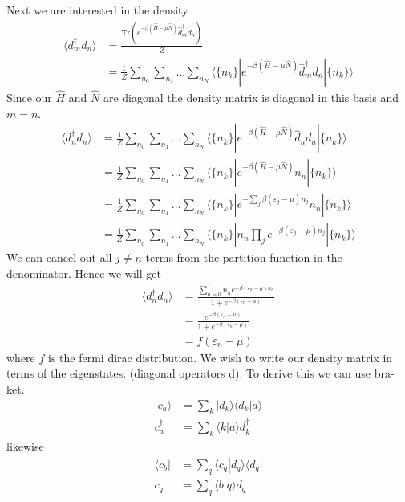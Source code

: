\documentclass[11pt]{article}
\begin{document}
Next we are interested in the density
\begin{align}
    \langle d^\dagger_m d_n \rangle &= \frac{\text{Tr}\left(e^{-\beta(\hat H - \mu \hat N)}\hat d_m^\dagger d_n\right)}{Z} \\\nonumber
    &= \frac{1}{Z} \sum_{n_0}\sum_{n_1}\ldots\sum_{n_N} \langle \{n_k\}|e^{-\beta(\hat H - \mu \hat N)}\hat d_m^\dagger d_n|\{n_k\}\rangle
\end{align}
Since our $\hat H$ and $\hat N$ are diagonal the density matrix is diagonal in this basis and $m = n$.
\begin{align}
    \langle d^\dagger_n d_n \rangle &=\frac{1}{Z}\sum_{n_0}\sum_{n_1}\ldots\sum_{n_N} \langle \{n_k\}|e^{-\beta(\hat H - \mu \hat N)}\hat d_n^\dagger d_n|\{n_k\}\rangle \\\nonumber
    &=\frac{1}{Z} \sum_{n_0}\sum_{n_1}\ldots\sum_{n_N} \langle \{n_k\}|e^{-\beta(\hat H - \mu \hat N)}n_n|\{n_k\}\rangle \\\nonumber
    &=\frac{1}{Z} \sum_{n_0}\sum_{n_1}\ldots\sum_{n_N} \langle \{n_k\}|e^{-\sum_j\beta(\varepsilon_j - \mu)n_j}n_n|\{n_k\}\rangle \\\nonumber
    &=\frac{1}{Z} \sum_{n_0}\sum_{n_1}\ldots\sum_{n_N} \langle \{n_k\}|n_n \prod_je^{-\beta(\varepsilon_j - \mu)n_j}|\{n_k\}\rangle
\end{align}
We can cancel out all $j\ne n$ terms from the partition function in the denominator. Hence we will get
\begin{align}
      \langle d^\dagger_n d_n \rangle &=\frac{\sum_{n=0}^1n_ne^{-\beta(\varepsilon_n - \mu)n_n}}{1+e^{-\beta(\varepsilon_n-\mu)}} \\\nonumber
      &= \frac{e^{-\beta(\varepsilon_n - \mu)}}{1+e^{-\beta(\varepsilon_n-\mu)}} \\\nonumber
      &= f(\varepsilon_n-\mu )
\end{align}
where $f$ is the fermi dirac distribution. We wish to write our density matrix in terms of the eigenstates. (diagonal operators d). To derive this
we can use bra-ket.
\begin{align}
    | c_a \rangle &= \sum_k |d_k\rangle \langle d_k | a \rangle \\\nonumber
    c^\dagger_a &= \sum_k \langle k | a \rangle d^\dagger_k
\end{align}
likewise
\begin{align}
    \langle c_b | &= \sum_q \langle c_q | d_q \rangle \langle d_q | \\\nonumber
    c_q &= \sum_q \langle b | q \rangle d_q
\end{align}
\end{document}
